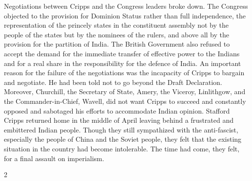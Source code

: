 \begin{multicols}{2}
Negotiations between Cripps and the Congress leaders broke down. The Congress objected to the provision for Dominion Status rather than full independence, the representation of the princely states in the constituent assembly not by the people of the states but by the nominees of the rulers, and above all by the provision for the partition of India. The British Government also refused to accept the demand for the immediate transfer of effective power to the Indians and for a real share in the responsibility for the defence of India. An important reason for the failure of the negotiations was the incapacity of Cripps to bargain and negotiate. He had been told not to go beyond the Draft Declaration. Moreover, Churchill, the Secretary of State, Amery, the Viceroy, Linlithgow, and the Commander-in-Chief, Wavell, did not want Cripps to succeed and constantly opposed and sabotaged his efforts to accommodate Indian opinion. Stafford Cripps returned home in the middle of April leaving behind a frustrated and embittered Indian people. Though they still sympathized with the anti-fascist, especially the people of China and the Soviet people, they felt that the existing situation in the country had become intolerable. The time had come, they felt, for a final assault on imperialism.
\end{multicols}{2}
